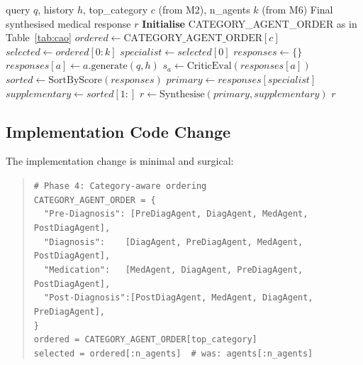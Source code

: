 \documentclass[a4paper,12pt]{article}
\begin{document}
\begin{algorithm}[h]
\caption{DMACN v2 with Category-Aware Routing (Phase 4)}
\label{alg:dmacn_v2}
\begin{algorithmic}[1]
\REQUIRE query $q$, history $h$, top\_category $c$ (from M2),
         n\_agents $k$ (from M6)
\ENSURE Final synthesised medical response $r$
\STATE \textbf{Initialise} CATEGORY\_AGENT\_ORDER as in Table~\ref{tab:cao}
\STATE $\textit{ordered} \leftarrow \text{CATEGORY\_AGENT\_ORDER}[c]$
\STATE $\textit{selected} \leftarrow \textit{ordered}[0:k]$
\STATE $\textit{specialist} \leftarrow \textit{selected}[0]$
\STATE $\textit{responses} \leftarrow \{\}$
  \STATE $\textit{responses}[a] \leftarrow a.\text{generate}(q, h)$
\ENDFOR
{}
  \STATE $s_a \leftarrow \text{CriticEval}(\textit{responses}[a])$
\ENDFOR
\STATE $\textit{sorted} \leftarrow \text{SortByScore}(\textit{responses})$
\STATE {}
\STATE $\textit{primary} \leftarrow \textit{responses}[\textit{specialist}]$
\STATE $\textit{supplementary} \leftarrow \textit{sorted}[1:]$
\STATE $r \leftarrow \text{Synthesise}(\textit{primary}, \textit{supplementary})$
\RETURN $r$
\end{algorithmic}
\end{algorithm}

\subsection{Implementation Code Change}

The implementation change is minimal and surgical:
\begin{quote}\small
\texttt{\# Phase 4: Category-aware ordering}\\
\texttt{CATEGORY\_AGENT\_ORDER = \{}\\
\texttt{\ \ "Pre-Diagnosis": [PreDiagAgent, DiagAgent, MedAgent, PostDiagAgent],}\\
\texttt{\ \ "Diagnosis":\ \ \ \ [DiagAgent, PreDiagAgent, MedAgent, PostDiagAgent],}\\
\texttt{\ \ "Medication":\ \ \ [MedAgent, DiagAgent, PreDiagAgent, PostDiagAgent],}\\
\texttt{\ \ "Post-Diagnosis":[PostDiagAgent, MedAgent, DiagAgent, PreDiagAgent],}\\
\texttt{\}}\\[4pt]
\texttt{ordered = CATEGORY\_AGENT\_ORDER[top\_category]}\\
\texttt{selected = ordered[:n\_agents]}~~\texttt{\# was: agents[:n\_agents]}
\end{quote}
\end{document}
